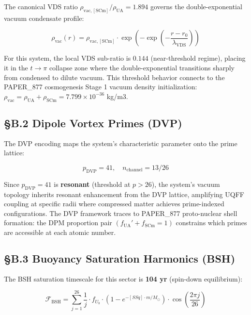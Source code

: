 \documentclass[12pt,a4paper]{article}
\begin{document}
The canonical VDS ratio $\rho_{\mathrm{vac,[SCm]}} / \rho_{\mathrm{UA}} = 1.894$ governs the double-exponential vacuum condensate profile:

\begin{equation}
\rho_{\mathrm{vac}}(r) = \rho_{\mathrm{vac,[SCm]}} \cdot \exp\!\left(-\exp\!\left(-\frac{r - r_0}{\lambda_{\mathrm{VDS}}}\right)\right)
\end{equation}

For this system, the local VDS sub-ratio is $0.144$ (near-threshold regime), placing it in the $t \to \pi$ collapse zone where the double-exponential transitions sharply from condensed to dilute vacuum. This threshold behavior connects to the PAPER\_877 cosmogenesis Stage 1 vacuum density initialization: $\rho_{\mathrm{vac}} = \rho_{\mathrm{UA}} + \rho_{\mathrm{SCm}} = 7.799 \times 10^{-36}$ kg/m3.

\subsection{\S{}B.2 Dipole Vortex Primes (DVP)}

The DVP encoding maps the system's characteristic parameter onto the prime lattice:

\begin{equation}
p_{\mathrm{DVP}} = 41, \quad n_{\mathrm{channel}} = 13/26
\end{equation}

Since $p_{\mathrm{DVP}} = 41$ is \textbf{resonant} (threshold at $p > 26$), the system's vacuum topology inherits resonant enhancement from the DVP lattice, amplifying UQFF coupling at specific radii where compressed matter achieves prime-indexed configurations. The DVP framework traces to PAPER\_877 proto-nuclear shell formation: the DPM proportion pair $(f_{\mathrm{UA}}' + f_{\mathrm{SCm}} = 1)$ constrains which primes are accessible at each atomic number.

\subsection{\S{}B.3 Buoyancy Saturation Harmonics (BSH)}

The BSH saturation timescale for this sector is \textbf{104 yr} (spin-down equilibrium):

\begin{equation}
\mathcal{F}_{\mathrm{BSH}} = \sum_{j=1}^{26} \frac{1}{j} \cdot f_U_b \cdot \left(1 - e^{-[SSq] \cdot m/M_\odot}\right) \cdot \cos\!\left(\frac{2\pi j}{26}\right)
\end{equation}
\end{document}
